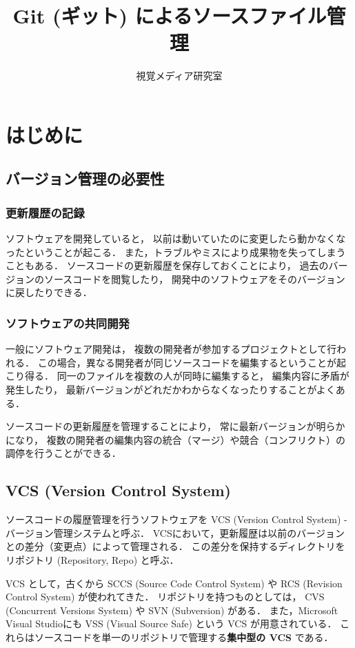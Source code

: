 \documentclass[a4j,10pt]{jarticle}
\title{\bf Git (ギット) によるソースファイル管理}
\author{視覚メディア研究室}
\date{}
\begin{document}
\maketitle
\section{はじめに}

\subsection{バージョン管理の必要性}

\subsubsection{更新履歴の記録}
ソフトウェアを開発していると，
以前は動いていたのに変更したら動かなくなったということが起こる．
また，トラブルやミスにより成果物を失ってしまうこともある．
ソースコードの更新履歴を保存しておくことにより，
過去のバージョンのソースコードを閲覧したり，
開発中のソフトウェアをそのバージョンに戻したりできる．

\subsubsection{ソフトウェアの共同開発}
一般にソフトウェア開発は，
複数の開発者が参加するプロジェクトとして行われる．
この場合，異なる開発者が同じソースコードを編集するということが起こり得る．
同一のファイルを複数の人が同時に編集すると，
編集内容に矛盾が発生したり，
最新バージョンがどれだかわからなくなったりすることがよくある．

ソースコードの更新履歴を管理することにより，
常に最新バージョンが明らかになり，
複数の開発者の編集内容の統合（マージ）や競合（コンフリクト）の調停を行うことができる．

\subsection{VCS (Version Control System)}
ソースコードの履歴管理を行うソフトウェアを
VCS (Version Control System) - バージョン管理システムと呼ぶ．
VCSにおいて，更新履歴は以前のバージョンとの差分（変更点）によって管理される．
この差分を保持するディレクトリをリポジトリ (Repository, Repo) と呼ぶ．

VCS として，古くから SCCS (Source Code Control System) や
RCS (Revision Control System) が使われてきた．
リポジトリを持つものとしては，
CVS (Concurrent Versions System) や SVN (Subversion) がある．
また，Microsoft Visual Studioにも
VSS (Visual Source Safe) という VCS が用意されている．
これらはソースコードを単一のリポジトリで管理する{\bf 集中型の VCS} である．
\end{document}
